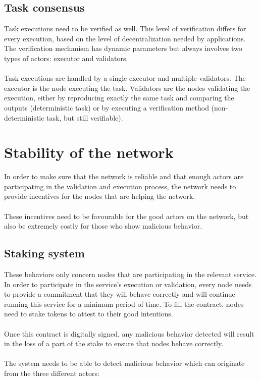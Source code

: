 \documentclass[12pt,a4paper,final]{article}
\begin{document}
\subsection{Task consensus}

Task executions need to be verified as well. This level of verification differs for every execution, based on the level of decentralization needed by applications. The verification mechanism has dynamic parameters but always involves two types of actors: executor and validators.
\\\\
Task executions are handled by a single executor and multiple validators. The executor is the node executing the task. Validators are the nodes validating the execution, either by reproducing exactly the same task and comparing the outputs (deterministic task) or by executing a verification method (non-deterministic task, but still verifiable).

\section{Stability of the network}

In order to make sure that the network is reliable and that enough actors are participating in the validation and execution process, the network needs to provide incentives for the nodes that are helping the network.
\\\\
These incentives need to be favourable for the good actors on the network, but also be extremely costly for those who show malicious behavior.

\subsection{Staking system}

These behaviors only concern nodes that are participating in the relevant service. In order to participate in the service’s execution or validation, every node needs to provide a commitment that they will behave correctly and will continue running this service for a minimum period of time. To fill the contract, nodes need to stake tokens to attest to their good intentions. 
\\\\
Once this contract is digitally signed, any malicious behavior detected will result in the loss of a part of the stake to ensure that nodes behave correctly.
\\\\
The system needs to be able to detect malicious behavior which can originate from the three different actors:
\end{document}
